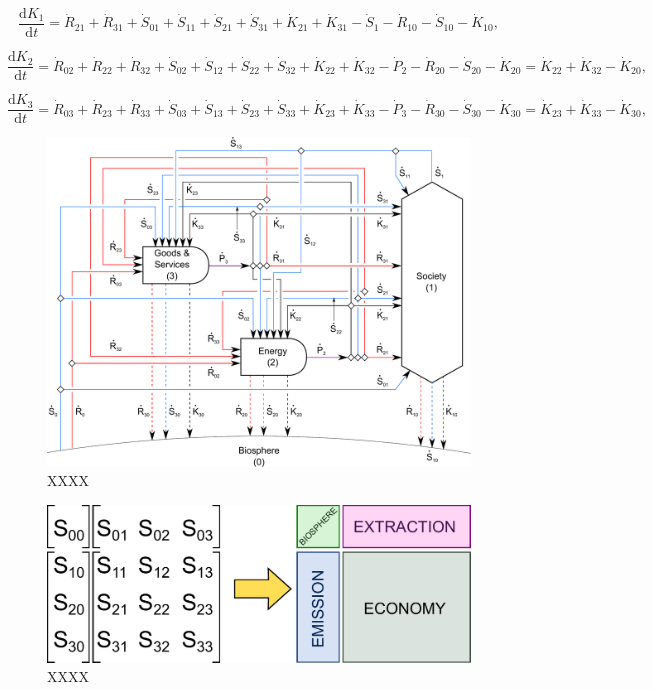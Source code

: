  \begin{equation} \label{eq:C-CV_R_dot_1b}
 	\frac{\mathrm{d}K_{1}}{\mathrm{d}t}
 	=  \dot{R}_{21} + \dot{R}_{31}
 	+ \dot{S}_{01} + \dot{S}_{11} 
	+ \dot{S}_{21} + \dot{S}_{31}
 	+ \dot{K}_{21} + \dot{K}_{31}
 	- \dot{S}_{1} 
	- \dot{R}_{10} 
 	- \dot{S}_{10} 
 	- \dot{K}_{10},
 \end{equation}
 
 \begin{equation} \label{eq:C-CV_R_dot_2b}
 	\frac{\mathrm{d}K_{2}}{\mathrm{d}t}
 	=  \dot{R}_{02} + \dot{R}_{22} + \dot{R}_{32}
 	+ \dot{S}_{02} + \dot{S}_{12} 
	+ \dot{S}_{22} + \dot{S}_{32} 
 	+ \dot{K}_{22} + \dot{K}_{32}
 	- \dot{P}_{2}
 	- \dot{R}_{20} 
 	- \dot{S}_{20} 
 	- \dot{K}_{20}
	=  \dot{K}_{22} + \dot{K}_{32} 
	- \dot{K}_{20},
 \end{equation}
 
 \begin{equation} \label{eq:C-CV_R_dot_3}
 	\frac{\mathrm{d}K_{3}}{\mathrm{d}t}
 	=  \dot{R}_{03} + \dot{R}_{23} + \dot{R}_{33}
 	+ \dot{S}_{03} + \dot{S}_{13} 
	+ \dot{S}_{23} + \dot{S}_{33} 
 	+ \dot{K}_{23} + \dot{K}_{33}
 	- \dot{P}_{3}
 	- \dot{R}_{30} 
 	- \dot{S}_{30} 
 	- \dot{K}_{30}
	=  \dot{K}_{23} + \dot{K}_{33} 
	- \dot{K}_{30},
 \end{equation}


\begin{figure}[h!]
\centering
\includegraphics[width=0.8\linewidth]{Part_1/Chapter_Materials/images/3_sector_materials.pdf}
\caption{XXXX}
\label{fig:C_materials}
\end{figure}

\begin{figure}[h!]
\centering
\includegraphics[width=0.8\linewidth]{Part_1/Chapter_Materials/images/Matrix.pdf}
\caption{XXXX}
\label{fig:C_mat_matrix}
\end{figure}

